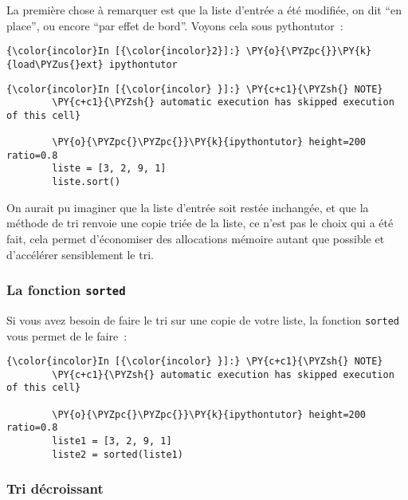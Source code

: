     La première chose à remarquer est que la liste d'entrée a été modifiée,
on dit ``en place'', ou encore ``par effet de bord''. Voyons cela sous
pythontutor~:

    \begin{Verbatim}[commandchars=\\\{\}]
{\color{incolor}In [{\color{incolor}2}]:} \PY{o}{\PYZpc{}}\PY{k}{load\PYZus{}ext} ipythontutor
\end{Verbatim}


    \begin{Verbatim}[commandchars=\\\{\}]
{\color{incolor}In [{\color{incolor} }]:} \PY{c+c1}{\PYZsh{} NOTE}
        \PY{c+c1}{\PYZsh{} automatic execution has skipped execution of this cell}
        
        \PY{o}{\PYZpc{}\PYZpc{}}\PY{k}{ipythontutor} height=200 ratio=0.8
        liste = [3, 2, 9, 1]
        liste.sort()
\end{Verbatim}


    On aurait pu imaginer que la liste d'entrée soit restée inchangée, et
que la méthode de tri renvoie une copie triée de la liste, ce n'est pas
le choix qui a été fait, cela permet d'économiser des allocations
mémoire autant que possible et d'accélérer sensiblement le tri.

    \hypertarget{la-fonction-sorted}{%
\subsubsection{\texorpdfstring{La fonction
\texttt{sorted}}{La fonction sorted}}\label{la-fonction-sorted}}

    Si vous avez besoin de faire le tri sur une copie de votre liste, la
fonction \texttt{sorted} vous permet de le faire~:

    \begin{Verbatim}[commandchars=\\\{\}]
{\color{incolor}In [{\color{incolor} }]:} \PY{c+c1}{\PYZsh{} NOTE}
        \PY{c+c1}{\PYZsh{} automatic execution has skipped execution of this cell}
        
        \PY{o}{\PYZpc{}\PYZpc{}}\PY{k}{ipythontutor} height=200 ratio=0.8
        liste1 = [3, 2, 9, 1]
        liste2 = sorted(liste1)
\end{Verbatim}


    \hypertarget{tri-duxe9croissant}{%
\subsubsection{Tri décroissant}\label{tri-duxe9croissant}}

